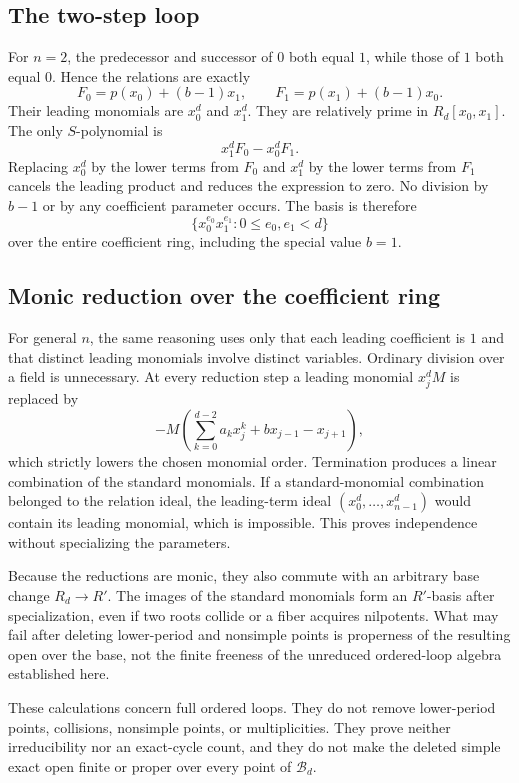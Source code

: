 \documentclass[11pt]{article}
\theoremstyle{definition}
\theoremstyle{remark}
\newcommand{\cB}{\mathcal B}
\begin{document}
\subsection*{The two-step loop}

For $n=2$, the predecessor and successor of $0$ both equal $1$, while those
of $1$ both equal $0$.  Hence the relations are exactly
\[
  F_0=p(x_0)+(b-1)x_1,
  \qquad
  F_1=p(x_1)+(b-1)x_0.
\]
Their leading monomials are $x_0^d$ and $x_1^d$.  They are relatively prime
in $R_d[x_0,x_1]$.  The only $S$-polynomial is
\[
  x_1^dF_0-x_0^dF_1.
\]
Replacing $x_0^d$ by the lower terms from $F_0$ and $x_1^d$ by the lower
terms from $F_1$ cancels the leading product and reduces the expression to
zero.  No division by $b-1$ or by any coefficient parameter occurs.  The
basis is therefore
\[
  \{x_0^{e_0}x_1^{e_1}:0\leq e_0,e_1<d\}
\]
over the entire coefficient ring, including the special value $b=1$.

\subsection*{Monic reduction over the coefficient ring}

For general $n$, the same reasoning uses only that each leading coefficient
is $1$ and that distinct leading monomials involve distinct variables.
Ordinary division over a field is unnecessary.  At every reduction step a
leading monomial $x_j^dM$ is replaced by
\[
  -M\left(
    \sum_{k=0}^{d-2}a_kx_j^k+b x_{j-1}-x_{j+1}
  \right),
\]
which strictly lowers the chosen monomial order.  Termination produces a
linear combination of the standard monomials.  If a standard-monomial
combination belonged to the relation ideal, the leading-term ideal
$(x_0^d,\ldots,x_{n-1}^d)$ would contain its leading monomial, which is
impossible.  This proves independence without specializing the parameters.

Because the reductions are monic, they also commute with an arbitrary base
change $R_d\to R'$.  The images of the standard monomials form an
$R'$-basis after specialization, even if two roots collide or a fiber
acquires nilpotents.  What may fail after deleting lower-period and
nonsimple points is properness of the resulting open over the base, not the
finite freeness of the unreduced ordered-loop algebra established here.

These calculations concern full ordered loops.  They do not remove
lower-period points, collisions, nonsimple points, or multiplicities.  They
prove neither irreducibility nor an exact-cycle count, and they do not make
the deleted simple exact open finite or proper over every point of $\cB_d$.

\clearpage


\end{document}
